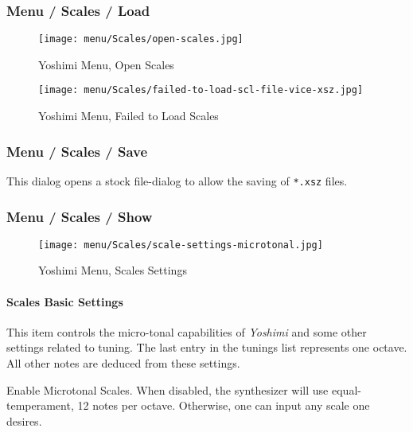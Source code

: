 \subsubsection{Menu / Scales / Load}
\label{subsec:menu_scales_load}

\begin{figure}[H]
   \centering 
   \texttt{[image: menu/Scales/open-scales.jpg]}
   \caption{Yoshimi Menu, Open Scales}
   \label{fig:yoshimi_menu_open_scales}
\end{figure}

\begin{figure}[H]
   \centering 
   \texttt{[image: menu/Scales/failed-to-load-scl-file-vice-xsz.jpg]}
   \caption{Yoshimi Menu, Failed to Load Scales}
   \label{fig:yoshimi_menu_failed_to_load_scales}
\end{figure}

\subsubsection{Menu / Scales / Save}
\label{subsec:menu_scales_save}

   This dialog opens a stock file-dialog to allow the saving of
   \texttt{*.xsz} files.

\subsubsection{Menu / Scales / Show}
\label{subsec:menu_scales_show}

\begin{figure}[H]
   \centering 
   \texttt{[image: menu/Scales/scale-settings-microtonal.jpg]}
   \caption{Yoshimi Menu, Scales Settings}
   \label{fig:yoshimi_menu_scales_settings}
\end{figure}

\paragraph{Scales Basic Settings}
\label{paragraph:menu_scales_basic_settings}

   This item controls the micro-tonal capabilities of \textsl{Yoshimi} and
   some other settings related to tuning. 
   The last entry in the tunings list represents one octave.
   All other notes are deduced from these settings.

   \setcounter{ItemCounter}{0}      %

   Enable Microtonal Scales.
   When disabled, the synthesizer will use equal-temperament, 12 notes per
   octave.  Otherwise, one can input any scale one desires.

